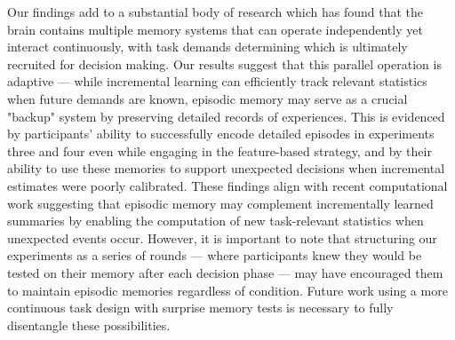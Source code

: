 \documentclass[10pt,letterpaper]{article}
\begin{document}
Our findings add to a substantial body of research which has found that the brain contains multiple memory systems that can operate independently yet interact continuously\cite{packardInactivationHippocampusCaudate1996, squireStructureFunctionDeclarative1996, poldrackCompetitionMultipleMemory2003, poldrackInteractiveMemorySystems2001, shohamyHabitsReinforcementLearning2014, montaser-kouhsariTwoRoutesValuebased2024}, with task demands determining which is ultimately recruited for decision making\cite{dawUncertaintybasedCompetitionPrefrontal2005, nicholasUncertaintyAltersBalance2022, leeNeuralComputationsUnderlying2014}. Our results suggest that this parallel operation is adaptive --- while incremental learning can efficiently track relevant statistics when future demands are known, episodic memory may serve as a crucial "backup" system by preserving detailed records of experiences. This is evidenced by participants' ability to successfully encode detailed episodes in experiments three and four even while engaging in the feature-based strategy, and by their ability to use these memories to support unexpected decisions when incremental estimates were poorly calibrated. These findings align with recent computational work\cite{nagyInterplayEpisodicSemantic2025} suggesting that episodic memory may complement incrementally learned summaries by enabling the computation of new task-relevant statistics when unexpected events occur. However, it is important to note that structuring our experiments as a series of rounds --- where participants knew they would be tested on their memory after each decision phase --- may have encouraged them to maintain episodic memories regardless of condition. Future work using a more continuous task design with surprise memory tests is necessary to fully disentangle these possibilities.
\end{document}
